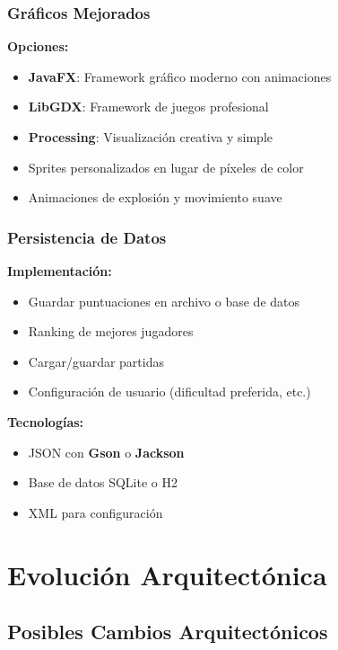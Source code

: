 \documentclass[12pt, a4paper]{article}
\begin{document}
\subsubsection{Gráficos Mejorados}

\textbf{Opciones:}
\begin{itemize}[leftmargin=2em]
    \item \textbf{JavaFX}: Framework gráfico moderno con animaciones
    \item \textbf{LibGDX}: Framework de juegos profesional
    \item \textbf{Processing}: Visualización creativa y simple
    \item Sprites personalizados en lugar de píxeles de color
    \item Animaciones de explosión y movimiento suave
\end{itemize}

\subsubsection{Persistencia de Datos}

\textbf{Implementación:}
\begin{itemize}[leftmargin=2em]
    \item Guardar puntuaciones en archivo o base de datos
    \item Ranking de mejores jugadores
    \item Cargar/guardar partidas
    \item Configuración de usuario (dificultad preferida, etc.)
\end{itemize}

\textbf{Tecnologías:}
\begin{itemize}[leftmargin=2em]
    \item JSON con \textbf{Gson} o \textbf{Jackson}
    \item Base de datos SQLite o H2
    \item XML para configuración
\end{itemize}

\section{Evolución Arquitectónica}

\subsection{Posibles Cambios Arquitectónicos}
\end{document}
